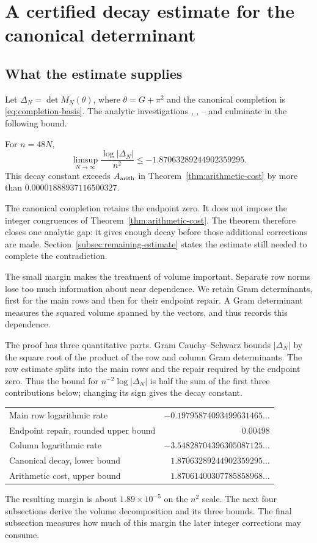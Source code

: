 \section{A certified decay estimate for the canonical determinant}\label{sec:canonical}

\subsection{What the estimate supplies}

Let $\Delta_N=\det M_N(\theta)$, where $\theta=G+\pi^2$ and the
canonical completion is \eqref{eq:completion-basis}. The analytic
investigations , , -- and
 culminate in the following bound.

\begin{theorem}\label{thm:canonical}
For $n=48N$,
\[
 \limsup_{N\to\infty}\frac{\log|\Delta_N|}{n^2}
 \le-1.87063289244902359295.
\]
This decay constant exceeds $A_{\rm arith}$ in
Theorem~\ref{thm:arithmetic-cost} by more than $0.00001888937116500327$.
\end{theorem}

The canonical completion retains the endpoint zero. It does not impose
the integer congruences of Theorem~\ref{thm:arithmetic-cost}. The theorem
therefore closes one analytic gap: it gives enough decay before those
additional corrections are made. Section~\ref{subsec:remaining-estimate}
states the estimate still needed to complete the contradiction.

The small margin makes the treatment of volume important. Separate
row norms lose too much information about near dependence. We retain
Gram determinants, first for the main rows and then for their endpoint
repair. A Gram determinant measures the squared volume spanned by the
vectors, and thus records this dependence.

The proof has three quantitative parts. Gram Cauchy--Schwarz bounds
$|\Delta_N|$ by the square root of the product of the row and column
Gram determinants. The row estimate splits into the main rows and the
repair required by the endpoint zero. Thus the bound for
$n^{-2}\log|\Delta_N|$ is half the sum of the first three contributions
below; changing its sign gives the decay constant.
\begin{center}
\begin{tabular}{lr}
\toprule
Main row logarithmic rate&$-0.19795874093499631465\ldots$\\
Endpoint repair, rounded upper bound&$0.00498$\\
Column logarithmic rate&$-3.54828704396305087125\ldots$\\
\midrule
Canonical decay, lower bound&$1.87063289244902359295\ldots$\\
Arithmetic cost, upper bound&$1.87061400307785858968\ldots$\\
\bottomrule
\end{tabular}
\end{center}
The resulting margin is about $1.89\times10^{-5}$ on the $n^2$ scale.
The next four subsections derive the volume decomposition and its three
bounds. The final subsection measures how much of this margin the later
integer corrections may consume.

